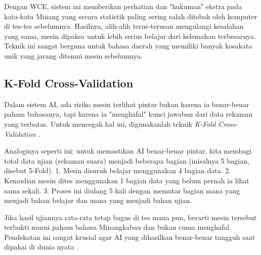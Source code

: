 Dengan WCE, sistem ini memberikan perhatian dan "hukuman" ekstra pada kata-kata Minang yang secara statistik paling sering salah ditebak oleh komputer di tes-tes sebelumnya. Hasilnya, alih-alih terus-terusan mengulangi kesalahan yang sama, mesin dipaksa untuk lebih serius belajar dari kelemahan terbesarnya. Teknik ini sangat berguna untuk bahasa daerah yang memiliki banyak kosakata unik yang jarang ditemui mesin sebelumnya.

\subsection{K-Fold Cross-Validation}
\label{II.KFoldCV}

Dalam sistem AI, ada risiko mesin terlihat pintar bukan karena ia benar-benar paham bahasanya, tapi karena ia "menghafal" kunci jawaban dari data rekaman yang terbatas. Untuk mencegah hal ini, digunakanlah teknik \textit{K-Fold Cross-Validation} \cite{kohavi1995crossvalidation}.

Analoginya seperti ini: untuk memastikan AI benar-benar pintar, kita membagi total data ujian (rekaman suara) menjadi beberapa bagian (misalnya 5 bagian, disebut 5-Fold). 
1. Mesin disuruh belajar menggunakan 4 bagian data.
2. Kemudian mesin dites menggunakan 1 bagian data yang belum pernah ia lihat sama sekali.
3. Proses ini diulang 5 kali dengan memutar bagian mana yang menjadi bahan belajar dan mana yang menjadi bahan ujian.

Jika hasil ujiannya rata-rata tetap bagus di tes mana pun, berarti mesin tersebut terbukti murni paham bahasa Minangkabau dan bukan cuma menghafal. Pendekatan ini sangat krusial agar AI yang dihasilkan benar-benar tangguh saat dipakai di dunia nyata \cite{kohavi1995crossvalidation}.